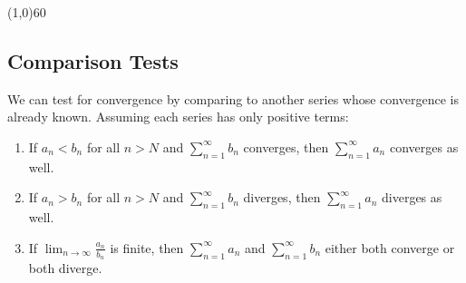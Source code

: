 \documentclass[10.5pt,twoside]{report}
\theoremstyle{definition}
\begin{document}
\line(1,0){60}
\linethickness{0.5mm}

\subsection{Comparison Tests}

We can test for convergence by comparing to another series whose convergence is already known.  Assuming each series has only positive terms: \\

\begin{enumerate}

\item If $a_n < b_n$ for all $n>N$ and $\displaystyle \sum_{n=1}^{\infty} b_n$ converges, then  $\displaystyle \sum_{n=1}^{\infty} a_n$ converges as well. 

\item If $a_n > b_n$ for all $n>N$ and $\displaystyle \sum_{n=1}^{\infty} b_n$ diverges, then  $\displaystyle \sum_{n=1}^{\infty} a_n$ diverges as well. 

\item If $\displaystyle \lim_{n\to \infty} \frac{a_n}{b_n}$ is finite, then $\displaystyle \sum_{n=1}^{\infty} a_n$ and $\displaystyle \sum_{n=1}^{\infty} b_n$ either both converge or both diverge.

\end{enumerate}

${}$\\
\end{document}
